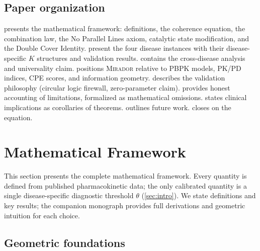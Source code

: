 \documentclass[11pt]{article}
\theoremstyle{plain}
\theoremstyle{definition}
\newcommand{\mirador}{\textsc{Mirador}}
\begin{document}
\subsection{Paper organization}
\label{sec:organization}

 presents the mathematical framework: definitions,
the coherence equation, the combination law, the No Parallel Lines
axiom, catalytic state modification, and the Double Cover Identity.
 present the four
disease instances with their disease-specific $K$ structures and
validation results.  contains the cross-disease
analysis and universality claim.  positions \mirador{}
relative to PBPK models, PK/PD indices, CPE scores, and information
geometry.  describes the validation philosophy
(circular logic firewall, zero-parameter claim). 
provides honest accounting of limitations, formalized as mathematical
omissions.  states clinical implications as
corollaries of theorems.  outlines future work.
 closes on the equation.


\section{Mathematical Framework}
\label{sec:framework}

This section presents the complete mathematical framework. Every
quantity is defined from published pharmacokinetic data; the only
calibrated quantity is a single disease-specific diagnostic threshold
$\theta$ (\cref{sec:intro}). We state definitions and key results;
the companion monograph provides full derivations and geometric
intuition for each choice.

\subsection{Geometric foundations}
\label{sec:geometric-foundations}
\end{document}
